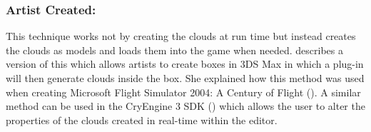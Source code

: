 \subsubsection{Artist Created:}
This technique works not by creating the clouds at run time but instead creates the clouds as models and loads them into the game when needed.
\citet{NWang04} describes a version of this which allows artists to create boxes in 3DS Max in which a plug-in will then generate clouds inside the box.
She explained how this method was used when creating Microsoft Flight Simulator 2004: A Century of Flight (\citeyear{MFS03}).
A similar method can be used in the CryEngine 3 SDK (\citeyear{Crytek13}) which allows the user to alter the properties of the clouds created in real-time within the editor. 